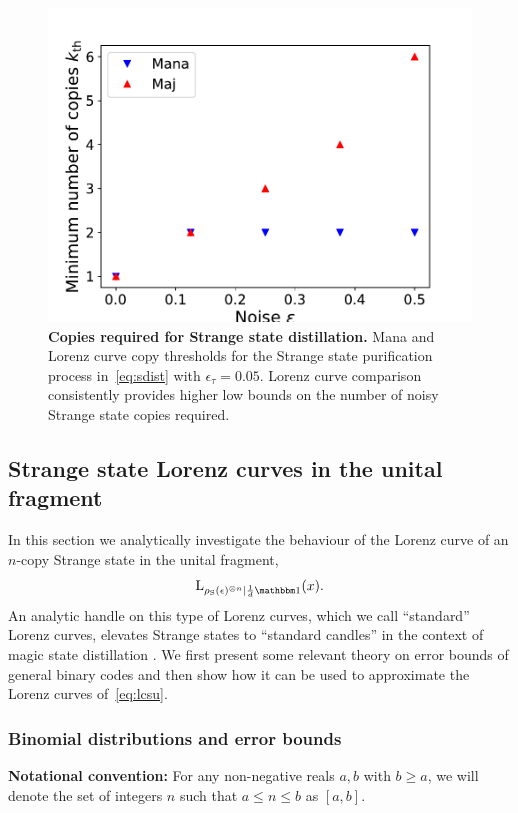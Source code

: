 \documentclass[pra,
aps,
twocolumn,
superscriptaddress,
groupedaddress,
nofootinbib,
reprint
]{revtex4-1}
\begin{document}
\begin{figure}
    \centering
    \includegraphics[scale=0.5]{figs/unital_distill_copies.pdf}
    \caption{\textbf{Copies required for Strange state distillation.} Mana and Lorenz curve copy thresholds for the Strange state purification process in~\cref{eq:sdist} with $\epsilon_\tau = 0.05$.
    Lorenz curve comparison consistently provides higher low bounds on the number of noisy Strange state copies required.
    }
    \label{fig:unital_distill_copies}
\end{figure}

\newpage

\subsection{Strange state Lorenz curves in the unital fragment}

In this section we analytically investigate the behaviour of the Lorenz curve of an $n$-copy Strange state in the unital fragment, 
\begin{equation}\label{eq:lcsu}
	\lc{\noisysn}{\frac{1}{d}\id}(x).
\end{equation}
An analytic handle on this type of Lorenz curves, which we call ``standard'' Lorenz curves, elevates Strange states to ``standard candles'' in the context of magic state distillation .
We first present some relevant theory on error bounds of general binary codes and then show how it can be used to approximate the Lorenz curves of~\cref{eq:lcsu}.

\subsubsection{Binomial distributions and error bounds}
\textbf{Notational convention:} For any non-negative reals $a,b$ with $b\geq a$, we will denote the set of integers $n$ such that $a\leq n \leq b$ as $[a,b]$.\\
\end{document}
